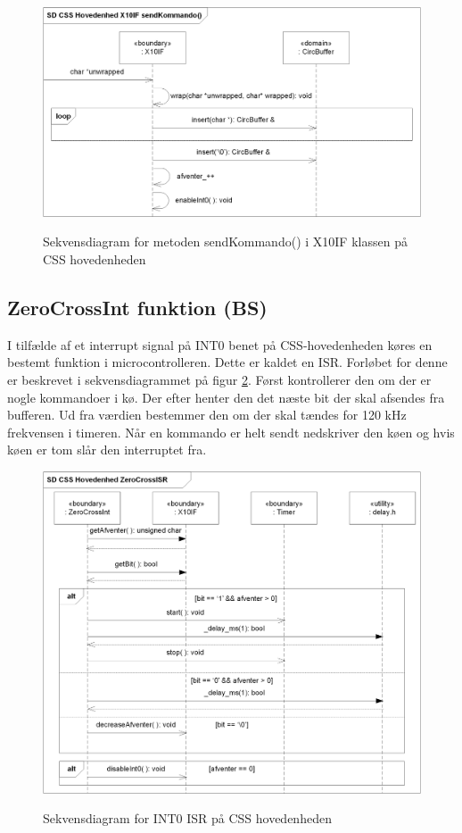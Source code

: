 \begin{figure}[!htb]
     {\includegraphics[width=\textwidth]{billeder/uml/CSS_X10IF_sendKommando_SD}}
     \caption{Sekvensdiagram for metoden sendKommando() i X10IF klassen på CSS hovedenheden}
     \label{fig:X10_sendKommando_sd}
\end{figure}

\subsection{ZeroCrossInt funktion (BS)}
I tilfælde af et interrupt signal på INT0 benet på CSS-hovedenheden køres en bestemt funktion i microcontrolleren. Dette er kaldet en ISR. Forløbet for denne er beskrevet i sekvensdiagrammet på figur \ref{fig:ZeroCrossISR}.
Først kontrollerer den om der er nogle kommandoer i kø. Der efter henter den det næste bit der skal afsendes fra bufferen. Ud fra værdien bestemmer den om der skal tændes for 120 kHz frekvensen i timeren. Når en kommando er helt sendt nedskriver den køen og hvis køen er tom slår den interruptet fra.

\begin{figure}[!htb]
     {\includegraphics[width=\textwidth]{billeder/uml/CSS_ZeroCrossInt_SD}}
     \caption{Sekvensdiagram for INT0 ISR på CSS hovedenheden}
     \label{fig:ZeroCrossISR}
\end{figure}

